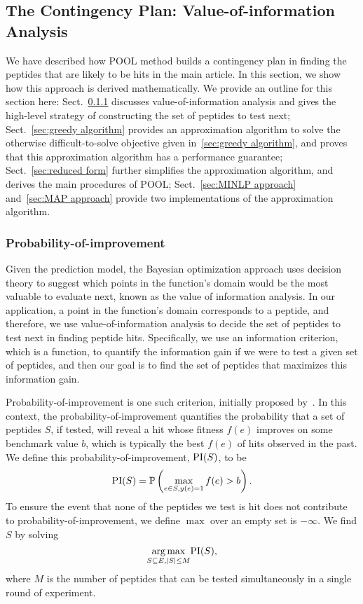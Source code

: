 \subsection{The Contingency Plan: Value-of-information Analysis}  \label{sec:voi}
We have described how POOL method builds a contingency plan in finding the peptides that are likely to be hits in the main article. In this section, we show how
this approach is derived mathematically. We provide an outline for this section here: 
Sect.~\ref{sec:prob improvement} discusses value-of-information analysis and gives the high-level strategy of constructing the set of peptides to test next;
Sect.~\ref{sec:greedy algorithm} provides an approximation algorithm to solve the otherwise difficult-to-solve objective given in~\ref{sec:greedy algorithm}, and
proves that this approximation algorithm has a performance guarantee;
Sect.~\ref{sec:reduced form} further simplifies the approximation algorithm, and derives the main procedures of POOL;
Sect.~\ref{sec:MINLP approach} and~\ref{sec:MAP approach} provide two implementations of the approximation algorithm.

\subsubsection{Probability-of-improvement} \label{sec:prob improvement} 
Given the prediction model, the Bayesian optimization approach uses decision theory to suggest which points in the function's domain would be the most valuable
to evaluate next, known as the value of information analysis. In our application, a point in the function's domain corresponds to a peptide, and therefore, we
use value-of-information analysis to decide the set of peptides to test next in finding peptide hits. Specifically, we use an information criterion, which is a
function, to quantify the information gain if we were to test a given set of peptides, and then our goal is to find the set of peptides that maximizes this
information gain.

Probability-of-improvement is one such criterion, initially proposed by~\cite{kushner1964new}. In this context, the probability-of-improvement quantifies the 
probability that a set of peptides $S$, if tested, will reveal a hit whose fitness $f(e)$ improves on some benchmark value $b$, 
which is typically the best $f(e)$ of hits observed in the past. We define this probability-of-improvement, $\text{PI}(S)$, to be
\begin{equation}
  \text{PI}(S) = \mathbb{P} \left( \max_{e \in S, y(e)=1} f(e) > b \right).
  \label{}
\end{equation}
To ensure the event that none of the peptides we test is hit does not contribute to probability-of-improvement, we define $\max$ over an empty set is $-\infty$. We find $S$ by solving
\begin{equation}
  \underset{S \subseteq E, |S| \leq M}{\arg\max} \text{PI}(S),
  \label{eq:opt PI}
\end{equation}
where $M$ is the number of peptides that can be tested simultaneously in a single round of experiment. 

